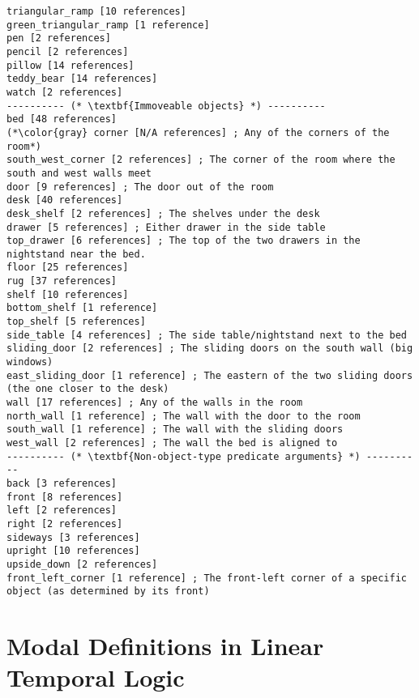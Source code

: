 \documentclass{article}
\begin{document}
\begin{lstlisting}
triangular_ramp [10 references] 
green_triangular_ramp [1 reference] 
pen [2 references] 
pencil [2 references] 
pillow [14 references] 
teddy_bear [14 references] 
watch [2 references] 
---------- (* \textbf{Immoveable objects} *) ----------
bed [48 references] 
(*\color{gray} corner [N/A references] ; Any of the corners of the room*)
south_west_corner [2 references] ; The corner of the room where the south and west walls meet
door [9 references] ; The door out of the room
desk [40 references] 
desk_shelf [2 references] ; The shelves under the desk
drawer [5 references] ; Either drawer in the side table
top_drawer [6 references] ; The top of the two drawers in the nightstand near the bed.
floor [25 references] 
rug [37 references] 
shelf [10 references] 
bottom_shelf [1 reference] 
top_shelf [5 references] 
side_table [4 references] ; The side table/nightstand next to the bed
sliding_door [2 references] ; The sliding doors on the south wall (big windows)
east_sliding_door [1 reference] ; The eastern of the two sliding doors (the one closer to the desk)
wall [17 references] ; Any of the walls in the room
north_wall [1 reference] ; The wall with the door to the room
south_wall [1 reference] ; The wall with the sliding doors
west_wall [2 references] ; The wall the bed is aligned to
---------- (* \textbf{Non-object-type predicate arguments} *) ----------
back [3 references] 
front [8 references] 
left [2 references] 
right [2 references] 
sideways [3 references] 
upright [10 references] 
upside_down [2 references] 
front_left_corner [1 reference] ; The front-left corner of a specific object (as determined by its front)
\end{lstlisting}




\section{Modal Definitions in Linear Temporal Logic}
\end{document}

